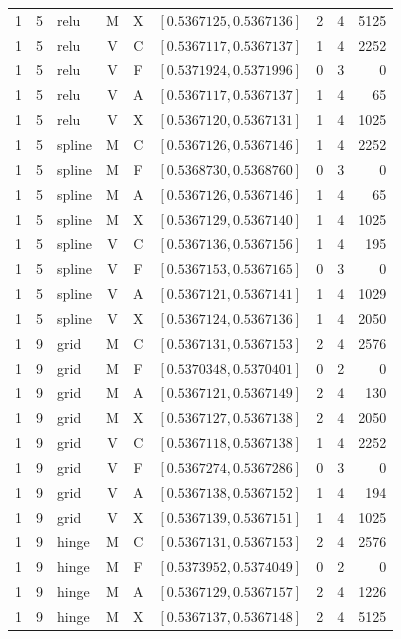 \begin{longtable}{r r l c c l r r r}
1 & 5 & relu & M & X & $[0.5367125,0.5367136]$ & 2 & 4 & 5125 \\
1 & 5 & relu & V & C & $[0.5367117,0.5367137]$ & 1 & 4 & 2252 \\
1 & 5 & relu & V & F & $[0.5371924,0.5371996]$ & 0 & 3 & 0 \\
1 & 5 & relu & V & A & $[0.5367117,0.5367137]$ & 1 & 4 & 65 \\
1 & 5 & relu & V & X & $[0.5367120,0.5367131]$ & 1 & 4 & 1025 \\
1 & 5 & spline & M & C & $[0.5367126,0.5367146]$ & 1 & 4 & 2252 \\
1 & 5 & spline & M & F & $[0.5368730,0.5368760]$ & 0 & 3 & 0 \\
1 & 5 & spline & M & A & $[0.5367126,0.5367146]$ & 1 & 4 & 65 \\
1 & 5 & spline & M & X & $[0.5367129,0.5367140]$ & 1 & 4 & 1025 \\
1 & 5 & spline & V & C & $[0.5367136,0.5367156]$ & 1 & 4 & 195 \\
1 & 5 & spline & V & F & $[0.5367153,0.5367165]$ & 0 & 3 & 0 \\
1 & 5 & spline & V & A & $[0.5367121,0.5367141]$ & 1 & 4 & 1029 \\
1 & 5 & spline & V & X & $[0.5367124,0.5367136]$ & 1 & 4 & 2050 \\
1 & 9 & grid & M & C & $[0.5367131,0.5367153]$ & 2 & 4 & 2576 \\
1 & 9 & grid & M & F & $[0.5370348,0.5370401]$ & 0 & 2 & 0 \\
1 & 9 & grid & M & A & $[0.5367121,0.5367149]$ & 2 & 4 & 130 \\
1 & 9 & grid & M & X & $[0.5367127,0.5367138]$ & 2 & 4 & 2050 \\
1 & 9 & grid & V & C & $[0.5367118,0.5367138]$ & 1 & 4 & 2252 \\
1 & 9 & grid & V & F & $[0.5367274,0.5367286]$ & 0 & 3 & 0 \\
1 & 9 & grid & V & A & $[0.5367138,0.5367152]$ & 1 & 4 & 194 \\
1 & 9 & grid & V & X & $[0.5367139,0.5367151]$ & 1 & 4 & 1025 \\
1 & 9 & hinge & M & C & $[0.5367131,0.5367153]$ & 2 & 4 & 2576 \\
1 & 9 & hinge & M & F & $[0.5373952,0.5374049]$ & 0 & 2 & 0 \\
1 & 9 & hinge & M & A & $[0.5367129,0.5367157]$ & 2 & 4 & 1226 \\
1 & 9 & hinge & M & X & $[0.5367137,0.5367148]$ & 2 & 4 & 5125 \\

\end{longtable}
